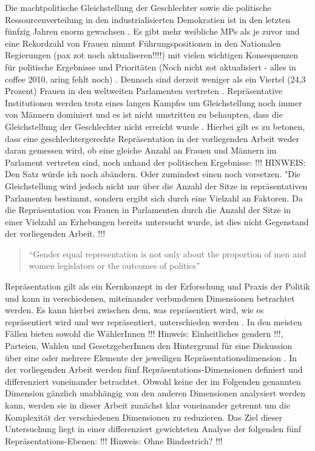 \documentclass[12pt, 
    twoside=false, 
    bibliography=totoc, 
    numbers=endperiod, 
    headings=normal, 
    toc=chapterentrydotfill
    ]{scrbook}
\begin{document}
Die machtpolitische Gleichstellung der Geschlechter sowie die politische Ressourcenverteilung in den industrialisierten Demokratien ist in den letzten fünfzig Jahren enorm gewachsen \parencite[318]{coffe_2010}. Es gibt mehr weibliche MPs als je zuvor und eine Rekordzahl von Frauen nimmt Führungspositionen in den Nationalen Regierungen\parencites{lovenduski_2005}{paxton_2007} (pax zot noch aktualiseren!!!!) mit vielen wichtigen Konsequenzen für politische Ergebnisse und Prioritäten \parencites{bolzendahl_2007}{carroll_2001}{aring_2000}[318]{coffe_2010} (Noch nicht zot aktualisiert - alles in coffee 2010, aring fehlt noch) . Dennoch sind derzeit weniger als ein Viertel (24,3 Prozent) Frauen in den weltweiten Parlamenten vertreten \parencite{ipu_2019}. Repräsentative Institutionen werden trotz eines langen Kampfes um Gleichstellung noch immer von Männern dominiert \parencites[149]{celis_2018}[497 f.]{childs_2013}{dahlerup_2013} {bjarnegard_2013} und es ist nicht umstritten zu behaupten, dass die Gleichstellung der Geschlechter nicht erreicht wurde \parencite[150]{celis_2018}. Hierbei gilt es zu betonen, dass eine geschlechtergerechte Repräsentation in der vorliegenden Arbeit weder daran gemessen wird, ob eine gleiche Anzahl an Frauen und Männern im Parlament vertreten sind, noch anhand der politischen Ergebnisse: !!! HINWEIS: Den Satz würde ich noch abändern. Oder zumindest einen noch vorsetzen. "Die Gleichstellung wird jedoch nicht nur über die Anzahl der Sitze in repräsentativen Parlamenten bestimmt, sondern ergibt sich durch eine Vielzahl an Faktoren. Da die Repräsentation von Frauen in Parlamenten durch die Anzahl der Sitze in einer Vielzahl an Erhebungen bereits untersucht wurde, ist dies nicht Gegenstand der vorliegenden Arbeit. !!!

\begin{quote}
     
 \enquote{Gender equal representation is not only about the proportion of men and women legislators or the
outcomes of politics}\parencite[197]{erikson_2018}
 \end{quote}

Repräsentation gilt als ein Kernkonzept in der Erforschung und Praxis der Politik und kann in verschiedenen, miteinander verbundenen Dimensionen betrachtet werden. Es kann hierbei zwischen dem, was repräsentiert wird, wie es repräsentiert wird und wer repräsentiert, unterschieden werden \parencite[557]{galligan_2007}. In den meisten Fällen bieten sowohl die WählerInnen !!! Hinweis: Einheitliches gendern !!!, Parteien, Wahlen und GesetzgeberInnen den Hintergrund für eine Diskussion über eine oder mehrere Elemente der jeweiligen Repräsentationsdimension \parencite[557]{galligan_2007}.
In der vorliegenden Arbeit werden fünf Repräsentations-Dimensionen definiert und differenziert voneinander betrachtet. Obwohl keine der im Folgenden genannten Dimension gänzlich unabhängig von den anderen Dimensionen analysiert werden kann, werden sie in dieser Arbeit zunächst klar voneinander getrennt um die Komplexität der verschiedenen Dimensionen zu reduzieren. Das Ziel dieser Untersuchung liegt in einer differenziert gewichteten Analyse der folgenden fünf Repräsentations-Ebenen: !!! Hinweis: Ohne Bindestrich? !!!
\end{document}
